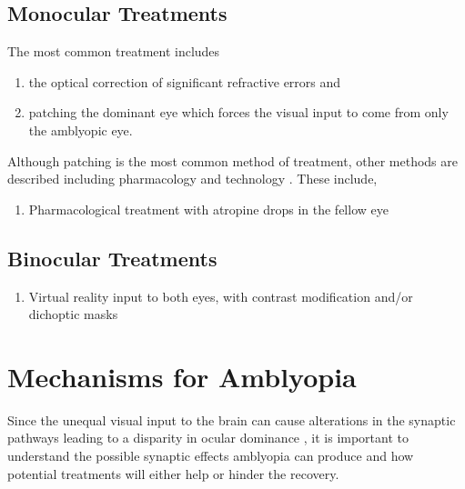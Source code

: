 \documentclass[
  letterpaper,
  number]{elsarticle}
\providecommand{\tightlist}{%
  \setlength{\itemsep}{0pt}\setlength{\parskip}{0pt}}\usepackage{longtable,booktabs,array}
\begin{document}
\hypertarget{monocular-treatments}{%
\subsection{Monocular Treatments}\label{monocular-treatments}}

The most common treatment includes

\begin{enumerate}
\def\labelenumi{\arabic{enumi}.}
\tightlist
\item
  the optical correction of significant refractive errors and
\item
  patching the dominant eye which forces the visual input to come from
  only the amblyopic eye.
\end{enumerate}

Although patching is the most common method of treatment, other methods
are described including pharmacology and technology
\citep{holmes2016randomized, Kelly_2016, Holmes_2016, Li:2015aa, de2007current, Gao_2018, glaser2002randomized}.
These include,

\begin{enumerate}
\def\labelenumi{\arabic{enumi}.}
\setcounter{enumi}{2}
\tightlist
\item
  Pharmacological treatment with atropine drops in the fellow eye
\end{enumerate}

\hypertarget{binocular-treatments}{%
\subsection{Binocular Treatments}\label{binocular-treatments}}

\begin{enumerate}
\def\labelenumi{\arabic{enumi}.}
\setcounter{enumi}{3}
\tightlist
\item
  Virtual reality input to both eyes, with contrast modification and/or
  dichoptic masks
\end{enumerate}

\hypertarget{mechanisms-for-amblyopia}{%
\section{Mechanisms for Amblyopia}\label{mechanisms-for-amblyopia}}

Since the unequal visual input to the brain can cause alterations in the
synaptic pathways leading to a disparity in ocular dominance
\citep{birch2013amblyopia}, it is important to understand the possible
synaptic effects amblyopia can produce and how potential treatments will
either help or hinder the recovery.
\end{document}
